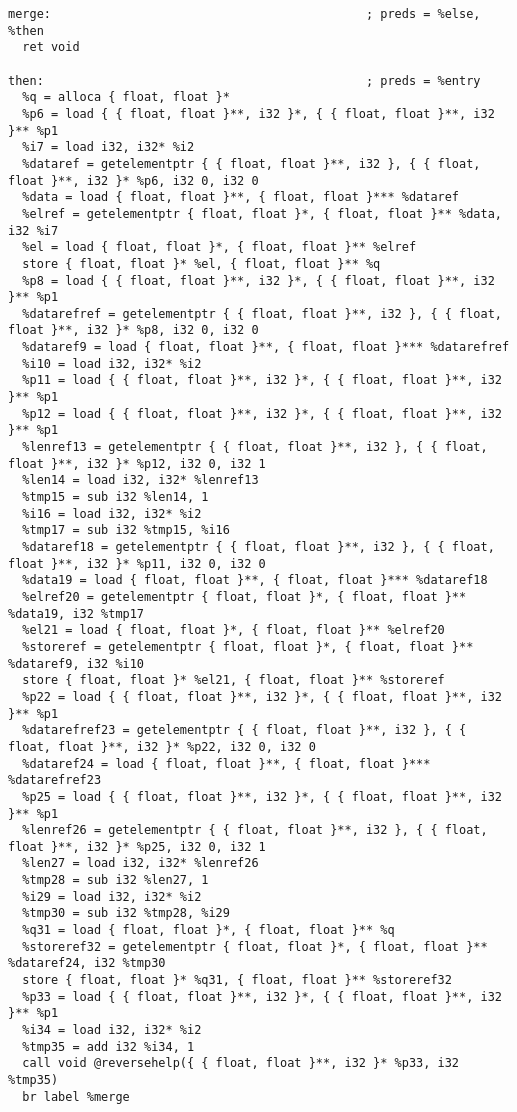 \documentclass[main.tex]{subfiles}
\begin{document}
{\begin{lstlisting}
merge:                                            ; preds = %else, %then
  ret void

then:                                             ; preds = %entry
  %q = alloca { float, float }*
  %p6 = load { { float, float }**, i32 }*, { { float, float }**, i32 }** %p1
  %i7 = load i32, i32* %i2
  %dataref = getelementptr { { float, float }**, i32 }, { { float, float }**, i32 }* %p6, i32 0, i32 0
  %data = load { float, float }**, { float, float }*** %dataref
  %elref = getelementptr { float, float }*, { float, float }** %data, i32 %i7
  %el = load { float, float }*, { float, float }** %elref
  store { float, float }* %el, { float, float }** %q
  %p8 = load { { float, float }**, i32 }*, { { float, float }**, i32 }** %p1
  %datarefref = getelementptr { { float, float }**, i32 }, { { float, float }**, i32 }* %p8, i32 0, i32 0
  %dataref9 = load { float, float }**, { float, float }*** %datarefref
  %i10 = load i32, i32* %i2
  %p11 = load { { float, float }**, i32 }*, { { float, float }**, i32 }** %p1
  %p12 = load { { float, float }**, i32 }*, { { float, float }**, i32 }** %p1
  %lenref13 = getelementptr { { float, float }**, i32 }, { { float, float }**, i32 }* %p12, i32 0, i32 1
  %len14 = load i32, i32* %lenref13
  %tmp15 = sub i32 %len14, 1
  %i16 = load i32, i32* %i2
  %tmp17 = sub i32 %tmp15, %i16
  %dataref18 = getelementptr { { float, float }**, i32 }, { { float, float }**, i32 }* %p11, i32 0, i32 0
  %data19 = load { float, float }**, { float, float }*** %dataref18
  %elref20 = getelementptr { float, float }*, { float, float }** %data19, i32 %tmp17
  %el21 = load { float, float }*, { float, float }** %elref20
  %storeref = getelementptr { float, float }*, { float, float }** %dataref9, i32 %i10
  store { float, float }* %el21, { float, float }** %storeref
  %p22 = load { { float, float }**, i32 }*, { { float, float }**, i32 }** %p1
  %datarefref23 = getelementptr { { float, float }**, i32 }, { { float, float }**, i32 }* %p22, i32 0, i32 0
  %dataref24 = load { float, float }**, { float, float }*** %datarefref23
  %p25 = load { { float, float }**, i32 }*, { { float, float }**, i32 }** %p1
  %lenref26 = getelementptr { { float, float }**, i32 }, { { float, float }**, i32 }* %p25, i32 0, i32 1
  %len27 = load i32, i32* %lenref26
  %tmp28 = sub i32 %len27, 1
  %i29 = load i32, i32* %i2
  %tmp30 = sub i32 %tmp28, %i29
  %q31 = load { float, float }*, { float, float }** %q
  %storeref32 = getelementptr { float, float }*, { float, float }** %dataref24, i32 %tmp30
  store { float, float }* %q31, { float, float }** %storeref32
  %p33 = load { { float, float }**, i32 }*, { { float, float }**, i32 }** %p1
  %i34 = load i32, i32* %i2
  %tmp35 = add i32 %i34, 1
  call void @reversehelp({ { float, float }**, i32 }* %p33, i32 %tmp35)
  br label %merge


\end{lstlisting}}
\end{document}

